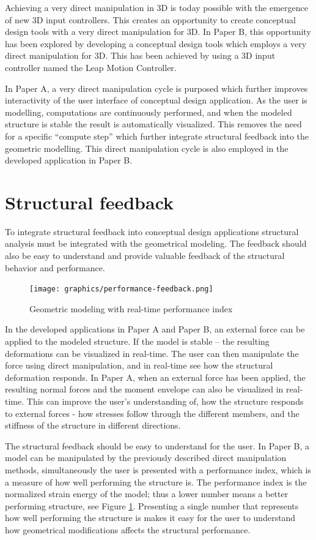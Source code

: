Achieving a very direct manipulation in 3D is today possible with the emergence of new 3D input controllers. This creates an opportunity to create conceptual design tools with a very direct manipulation for 3D. In Paper B, this opportunity has been explored by developing a conceptual design tools which employs a very direct manipulation for 3D. This has been achieved by using a 3D input controller named the Leap Motion Controller. 

In Paper A, a very direct manipulation cycle is purposed which further improves interactivity of the user interface of conceptual design application. As the user is modelling, computations are continuously performed, and when the modeled structure is stable the result is automatically visualized. This removes the need for a specific “compute step” which further integrate structural feedback into the geometric modelling. This direct manipulation cycle is also employed in the developed application in Paper B.

\section{Structural feedback}
To integrate structural feedback into conceptual design applications structural analysis must be integrated with the geometrical modeling. The feedback should also be easy to understand and provide valuable feedback of the structural behavior and performance.

\begin{figure}
  \texttt{[image: graphics/performance-feedback.png]}
  \caption{Geometric modeling with real-time performance index}
  \label{fig:performance-feedback}
\end{figure}

In the developed applications in Paper A and Paper B, an external force can be applied to the modeled structure. If the model is stable – the resulting deformations can be visualized in real-time. The user can then manipulate the force using direct manipulation, and in real-time see how the structural deformation responds. In Paper A, when an external force has been applied, the resulting normal forces and the moment envelope can also be visualized in real-time. This can improve the user’s understanding of, how the structure responds to external forces - how stresses follow through the different members, and the stiffness of the structure in different directions.

The structural feedback should be easy to understand for the user. In Paper B, a model can be manipulated by the previously described direct manipulation methods, simultaneously the user is presented with a performance index, which is a measure of how well performing the structure is. The performance index is the normalized strain energy of the model; thus a lower number means a better performing structure, see Figure \ref{fig:performance-feedback}. Presenting a single number that represents how well performing the structure is makes it easy for the user to understand how geometrical modifications affects the structural performance.



